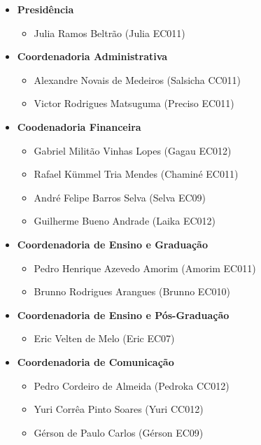 \begin{itemize}
\item   \textbf{Presidência}
        \begin{itemize}
        \item Julia Ramos Beltrão (Julia EC011)
        \end{itemize}

\item   \textbf{Coordenadoria Administrativa}
        \begin{itemize}
        \item Alexandre Novais de Medeiros (Salsicha CC011)
        \item Victor Rodrigues Matsuguma (Preciso EC011)
        \end{itemize}

\item   \textbf{Coodenadoria Financeira}
        \begin{itemize}
        \item Gabriel Militão Vinhas Lopes (Gagau EC012)
        \item Rafael Kümmel Tria Mendes (Chaminé EC011)
        \item André Felipe Barros Selva (Selva EC09)
        \item Guilherme Bueno Andrade (Laika EC012)
        \end{itemize}

\item   \textbf{Coordenadoria de Ensino e Graduação}
        \begin{itemize}
        \item Pedro Henrique Azevedo Amorim (Amorim EC011)
        \item Brunno Rodrigues Arangues (Brunno EC010)
        \end{itemize}

\item   \textbf{Coordenadoria de Ensino e Pós-Graduação}
        \begin{itemize}
        \item Eric Velten de Melo (Eric EC07)
        \end{itemize}

\item   \textbf{Coordenadoria de Comunicação}
        \begin{itemize}
        \item Pedro Cordeiro de Almeida (Pedroka CC012)
        \item Yuri Corrêa Pinto Soares (Yuri CC012)
        \item Gérson de Paulo Carlos (Gérson EC09)
        \end{itemize}


\end{itemize}
